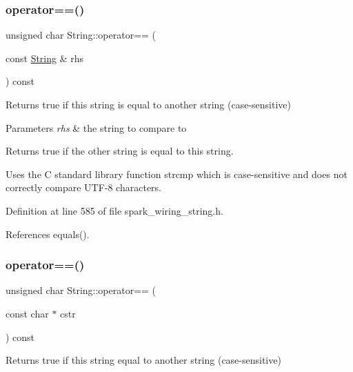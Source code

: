 \subsubsection{\texorpdfstring{operator==()}{operator==()}\hspace{0.1cm}{\footnotesize\ttfamily [1/2]}}
{\footnotesize\ttfamily unsigned char String\+::operator== (\begin{DoxyParamCaption}\item[{const \hyperlink{class_string}{String} \&}]{rhs }\end{DoxyParamCaption}) const\hspace{0.3cm}{\ttfamily [inline]}}



Returns true if this string is equal to another string (case-\/sensitive) 


\begin{DoxyParams}{Parameters}
{\em rhs} & the string to compare to\\
\hline
\end{DoxyParams}
\begin{DoxyReturn}{Returns}
true if the other string is equal to this string.
\end{DoxyReturn}
Uses the C standard library function strcmp which is case-\/sensitive and does not correctly compare U\+T\+F-\/8 characters. 

Definition at line 585 of file spark\+\_\+wiring\+\_\+string.\+h.



References equals().

\mbox{\label{class_string_ad453b9631caf5d0164ae493bf1aa9680}} 
\subsubsection{\texorpdfstring{operator==()}{operator==()}\hspace{0.1cm}{\footnotesize\ttfamily [2/2]}}
{\footnotesize\ttfamily unsigned char String\+::operator== (\begin{DoxyParamCaption}\item[{const char $\ast$}]{cstr }\end{DoxyParamCaption}) const\hspace{0.3cm}{\ttfamily [inline]}}



Returns true if this string equal to another string (case-\/sensitive) 


